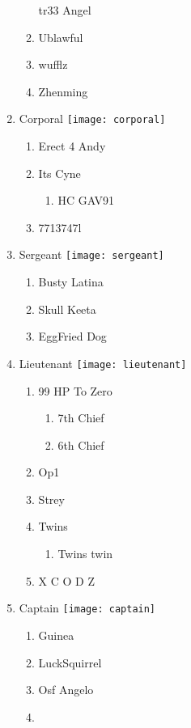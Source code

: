 \documentclass{article}
\begin{document}
\begin{enumerate}[I]
\begin{enumerate}[I]
	tr33 Angel
      \item
	Ublawful
      \item
	wufflz
      \item
	Zhenming
    \end{enumerate}
  \item
    Corporal \texttt{[image: corporal]}
    \begin{enumerate}[I]
      \item
	Erect 4 Andy
      \item
	Its Cyne
	\begin{enumerate}[I]
	  \item
	    HC GAV91
	\end{enumerate}
      \item
	7713747l
    \end{enumerate}
  \item
    Sergeant \texttt{[image: sergeant]}
    \begin{enumerate}[I]
      \item
	Busty Latina
      \item
	Skull Keeta
      \item
	EggFried Dog
    \end{enumerate}
  \item
    Lieutenant \texttt{[image: lieutenant]}
    \begin{enumerate}[I]
      \item 
	99 HP To Zero
	\begin{enumerate}[I]
	  \item
	    7th Chief
	  \item
	    6th Chief
	\end{enumerate}
      \item
	Op1
      \item
	Strey
      \item
	Twins
	  \begin{enumerate}[I]
	    \item
	      Twins twin
	  \end{enumerate}
      \item
	X C O D Z
    \end{enumerate}
  \item
    Captain \texttt{[image: captain]}
    \begin{enumerate}[I]
      \item
	Guinea
      \item
	LuckSquirrel
      \item
	Osf Angelo
      \item

\end{enumerate}
\end{enumerate}
\end{document}
